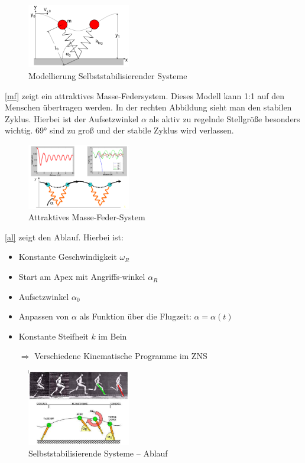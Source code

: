 \begin{figure}[h!]
	\centering
	\includegraphics[width=0.4\textwidth]{figures/ch06_blickhan2.png}
	\caption{Modellierung Selbststabilisierender Systeme}
	\label{blick2}
\end{figure}
\autoref{mf} zeigt ein attraktives Masse-Federsystem. Dieses Modell kann 1:1 auf den Menschen übertragen werden. In der rechten Abbildung sieht man den stabilen Zyklus. Hierbei ist der Aufsetzwinkel $\alpha$ als aktiv zu regelnde Stellgröße besonders wichtig. 69° sind zu groß und der stabile Zyklus wird verlassen. 
\begin{figure}[h!]
	\centering
	\includegraphics[width=0.4\textwidth]{figures/ch06_masse-feder.png}
	\caption{Attraktives Masse-Feder-System}
	\label{mf}
\end{figure}
\autoref{al} zeigt den Ablauf. Hierbei ist:
\begin{itemize}
\item Konstante Geschwindigkeit $\omega_R$
\item Start am Apex mit Angriffs-winkel $\alpha_R$
\item Aufsetzwinkel $\alpha_0$
\item Anpassen von $\alpha$ als Funktion über die Flugzeit: $\alpha=\alpha(t)$
\item Konstante Steifheit $k$ im Bein
\item[$\Rightarrow$] Verschiedene \glqq Kinematische Programme\grqq{} im ZNS
\end{itemize}
\begin{figure}[h!]
	\centering
	\includegraphics[width=0.4\textwidth]{figures/ch06_ablauf.png}
	\caption{Selbststabilisierende Systeme -- Ablauf}
	\label{al}
\end{figure}
